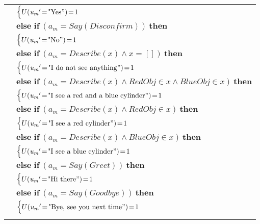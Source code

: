 \begin{footnotesize}
\begin{longtable}{p{2cm}l}
& \;\;\;\;\; $ \begin{cases}U(\mathit{u_m}'\!=\!\text{"Yes}")\!=\!1 \end{cases}$ \vspace{1mm} \\ & $ \textbf{else if} \ (\mathit{a_m}\!=\!\mathit{Say(Disconfirm)}) \ \textbf{then}$ \\
& \;\;\;\;\; $ \begin{cases}U(\mathit{u_m}'\!=\!\text{"No}")\!=\!1 \end{cases}$ \vspace{1mm} \\ & $ \textbf{else if} \ (\mathit{a_m}\!=\!\mathit{Describe({x})} \land \mathit{x}\!=\!\mathit{[]}) \ \textbf{then}$ \\
& \;\;\;\;\; $ \begin{cases}U(\mathit{u_m}'\!=\!\text{"I do not see anything}")\!=\!1 \end{cases}$ \vspace{1mm} \\ & $ \textbf{else if} \ (\mathit{a_m}\!=\!\mathit{Describe({x})} \land \mathit{RedObj}\!\in\!\mathit{x} \land \mathit{BlueObj}\!\in\!\mathit{x}) \ \textbf{then}$ \\
& \;\;\;\;\; $ \begin{cases}U(\mathit{u_m}'\!=\!\text{"I see a red and a blue cylinder}")\!=\!1 \end{cases}$ \vspace{1mm} \\ & $ \textbf{else if} \ (\mathit{a_m}\!=\!\mathit{Describe({x})} \land \mathit{RedObj}\!\in\!\mathit{x}) \ \textbf{then}$ \\
& \;\;\;\;\; $ \begin{cases}U(\mathit{u_m}'\!=\!\text{"I see a red cylinder}")\!=\!1 \end{cases}$ \vspace{1mm} \\ & $ \textbf{else if} \ (\mathit{a_m}\!=\!\mathit{Describe({x})} \land \mathit{BlueObj}\!\in\!\mathit{x}) \ \textbf{then}$ \\
& \;\;\;\;\; $ \begin{cases}U(\mathit{u_m}'\!=\!\text{"I see a blue cylinder}")\!=\!1 \end{cases}$ \vspace{1mm} \\ & $ \textbf{else if} \ (\mathit{a_m}\!=\!\mathit{Say(Greet)}) \ \textbf{then}$ \\
& \;\;\;\;\; $ \begin{cases}U(\mathit{u_m}'\!=\!\text{"Hi there}")\!=\!1 \end{cases}$ \vspace{1mm} \\ & $ \textbf{else if} \ (\mathit{a_m}\!=\!\mathit{Say(Goodbye)}) \ \textbf{then}$ \\
& \;\;\;\;\; $ \begin{cases}U(\mathit{u_m}'\!=\!\text{"Bye, see you next time}")\!=\!1 \end{cases}$ \\ \\[-1mm]
\end{longtable}
\end{footnotesize}
